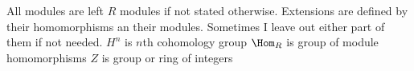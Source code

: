 All modules are left $R$ modules if not stated otherwise.
Extensions are defined by their homomorphisms an their modules. Sometimes I leave out either part of them if not needed.
$H^n$ is $n$th cohomology group
$\Hom_R$ is group of module homomorphisms
$Z$ is group or ring of integers
